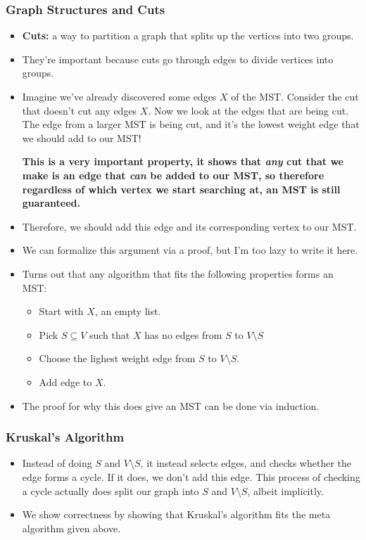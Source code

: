 \documentclass[10pt]{article}
\begin{document}
	\subsubsection{Graph Structures and Cuts}
	\begin{itemize}
		\item \textbf{Cuts:} a way to partition a graph that splits up the vertices into two groups. 
		\item They're important because cuts go through edges to divide vertices into groups.  
		\item Imagine we've already discovered some edges $X$ of the MST. Consider the cut that doesn't cut 
			any edges $X$. Now we look at the edges that are being cut. The edge from a larger MST is being cut,
			and it's the lowest weight edge that we should add to our MST!

			\textbf{This is a very important property, it shows that \textit{any} cut that we make 
				is an edge that \textit{can} be added to our MST, so therefore regardless of which vertex
			we start searching at, an MST is still guaranteed.}
		\item Therefore, we should add this edge and its corresponding vertex to our MST.
		\item We can formalize this argument via a proof, but I'm too lazy to write it here.
		\item Turns out that any algorithm that fits the following properties forms an MST:
			\begin{itemize}
				\item Start with $X$, an empty list.  
				\item Pick $S \subseteq V$ such that $X$ has no edges from $S$ to $V \setminus S$
				\item Choose the lighest weight edge from $S$ to $V \setminus S$. 
				\item Add edge to $X$.
			\end{itemize}
		\item The proof for why this does give an MST can be done via induction.
	\end{itemize}
	\subsubsection{Kruskal's Algorithm}
	\begin{itemize}
		\item Instead of doing $S$ and $V \setminus S$, it instead selects edges, and checks whether 
			the edge forms a cycle. If it does, we don't add this edge. This process of checking a cycle 
			actually does split our graph into $S$ and $V \setminus S$, albeit implicitly. 
		\item We show correctness by showing that Kruskal's algorithm fits the meta algorithm given above. 
	\end{itemize}
\end{document}

